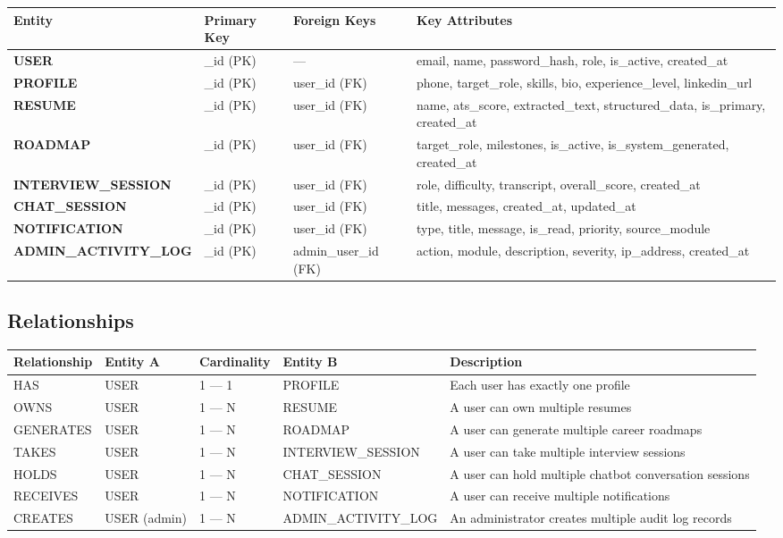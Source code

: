 \documentclass[12pt]{article}
\begin{document}
\begin{longtable}{|p{}|p{}|p{}|p{}|}
\hline
\textbf{Entity} & \textbf{Primary Key} & \textbf{Foreign Keys} & \textbf{Key Attributes} \\ \hline
\endhead
\textbf{USER} & \_id (PK) & — & email, name, password\_hash, role, is\_active, created\_at \\ \hline
\textbf{PROFILE} & \_id (PK) & user\_id (FK) & phone, target\_role, skills, bio, experience\_level, linkedin\_url \\ \hline
\textbf{RESUME} & \_id (PK) & user\_id (FK) & name, ats\_score, extracted\_text, structured\_data, is\_primary, created\_at \\ \hline
\textbf{ROADMAP} & \_id (PK) & user\_id (FK) & target\_role, milestones, is\_active, is\_system\_generated, created\_at \\ \hline
\textbf{INTERVIEW\_SESSION} & \_id (PK) & user\_id (FK) & role, difficulty, transcript, overall\_score, created\_at \\ \hline
\textbf{CHAT\_SESSION} & \_id (PK) & user\_id (FK) & title, messages, created\_at, updated\_at \\ \hline
\textbf{NOTIFICATION} & \_id (PK) & user\_id (FK) & type, title, message, is\_read, priority, source\_module \\ \hline
\textbf{ADMIN\_ACTIVITY\_LOG} & \_id (PK) & admin\_user\_id (FK) & action, module, description, severity, ip\_address, created\_at \\ \hline
\end{longtable}


\subsection{Relationships}


\begin{longtable}{|p{}|p{}|p{}|p{}|p{}|}
\hline
\textbf{Relationship} & \textbf{Entity A} & \textbf{Cardinality} & \textbf{Entity B} & \textbf{Description} \\ \hline
\endhead
HAS & USER & 1 — 1 & PROFILE & Each user has exactly one profile \\ \hline
OWNS & USER & 1 — N & RESUME & A user can own multiple resumes \\ \hline
GENERATES & USER & 1 — N & ROADMAP & A user can generate multiple career roadmaps \\ \hline
TAKES & USER & 1 — N & INTERVIEW\_SESSION & A user can take multiple interview sessions \\ \hline
HOLDS & USER & 1 — N & CHAT\_SESSION & A user can hold multiple chatbot conversation sessions \\ \hline
RECEIVES & USER & 1 — N & NOTIFICATION & A user can receive multiple notifications \\ \hline
CREATES & USER (admin) & 1 — N & ADMIN\_ACTIVITY\_LOG & An administrator creates multiple audit log records \\ \hline
\end{longtable}
\end{document}
